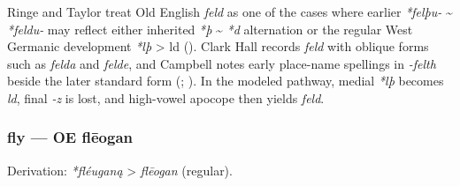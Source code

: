 \documentclass[
  british,
  a4paper,
]{article}
\begin{document}
Ringe and Taylor treat Old English \emph{feld} as one of the cases where
earlier \emph{*felþu-} \textasciitilde{} \emph{*feldu-} may reflect
either inherited \emph{*þ} \textasciitilde{} \emph{*d} alternation or
the regular West Germanic development \emph{*lþ} \textgreater{} ld
(). Clark Hall
records \emph{feld} with oblique forms such as \emph{felda} and
\emph{felde}, and Campbell notes early place-name spellings in
\emph{-felth} beside the later standard form
(;
). In the modeled
pathway, medial \emph{*lþ} becomes \emph{ld}, final \emph{-z} is lost,
and high-vowel apocope then yields \emph{feld}.

\subsubsection{fly --- OE flēogan}\label{fly-oe-flux113ogan}

Derivation: \emph{*fléuganą} \textgreater{} \emph{flēogan} (regular).

\begingroup
\setlength{\fboxsep}{6pt}
\end{document}
